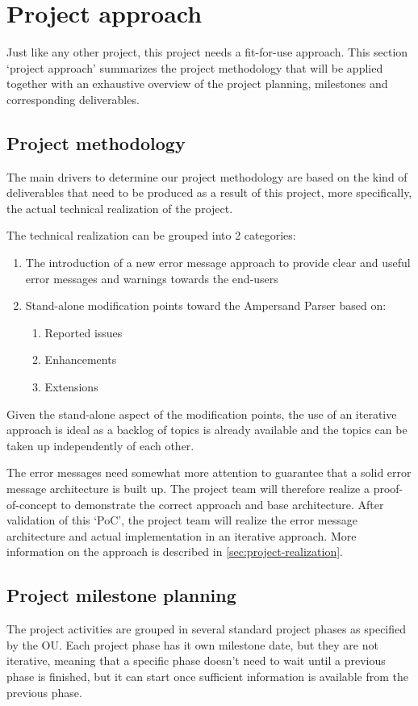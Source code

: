 \section{Project approach}
\label{sec:project-approach}
Just like any other project, this project needs a fit-for-use approach. 
This section `project approach' summarizes the project methodology that will be applied together with an exhaustive overview of the project planning, milestones and corresponding deliverables.

\subsection{Project methodology}
The main drivers to determine our project methodology are based on the kind of deliverables that need to be produced as a result of this project, more specifically, the actual technical realization of the project.

The technical realization can be grouped into 2 categories:
\begin{enumerate}
	\item The introduction of a new error message approach to provide clear and useful error messages and warnings towards the end-users
	\item Stand-alone modification points toward the Ampersand Parser based on:
	\begin{enumerate}
		\item Reported issues
		\item Enhancements
		\item Extensions
	\end {enumerate}
\end {enumerate}

\noindent
Given the stand-alone aspect of the modification points, the use of an iterative approach is ideal as a backlog of topics is already available and the topics can be taken up independently of each other. 

%
The error messages need somewhat more attention to guarantee that a solid error message architecture is built up. 
The project team will therefore realize a proof-of-concept to demonstrate the correct approach and base architecture. 
After validation of this `PoC', the project team will realize the error message architecture and actual implementation in an iterative approach.
More information on the approach is described in \autoref{sec:project-realization}.

\subsection{Project milestone planning}
\label{subsec:planning-milestones-deliverables}
The project activities are grouped in several standard project phases as specified by the OU.
Each project phase has it own milestone date, but they are not iterative, meaning that a specific phase doesn't need to wait until a previous phase is finished, but it can start once sufficient information is available from the previous phase.

